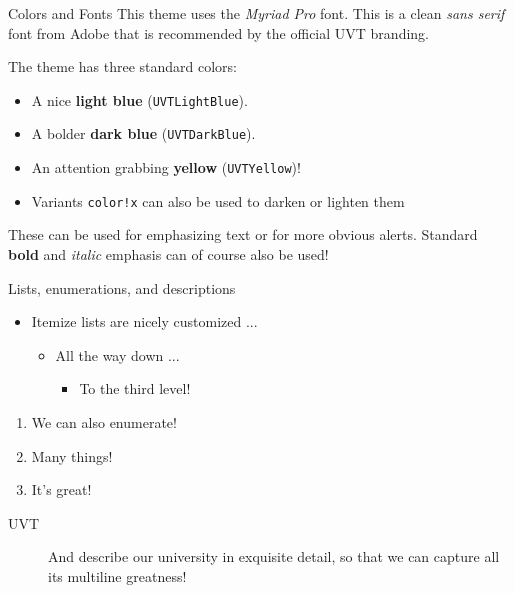 \documentclass[final]{beamer}
\begin{document}
\begin{frame}[fragile]
\begin{columns}[t]
\begin{column}{0.3\paperwidth}
\begin{block}{Colors and Fonts}
    This theme uses the \emph{Myriad Pro} font. This is a clean \emph{sans serif}
    font from Adobe that is recommended by the official UVT branding.

    \bigskip
    The theme has three standard colors:
    \begin{itemize}
        \item A nice \textcolor{UVTLightBlue}{\textbf{light blue}} (\texttt{UVTLightBlue}).
        \item A bolder \textcolor{UVTDarkBlue}{\textbf{dark blue}} (\texttt{UVTDarkBlue}).
        \item An attention grabbing \textcolor{UVTYellow}{\textbf{yellow}}
        (\texttt{UVTYellow})!
        \item Variants \texttt{color!x} can also be used to darken or lighten them
    \end{itemize}

    \bigskip
    These can be used for emphasizing \textcolor{UVTLightBlue}{text} or for
    more obvious \alert{alerts}. Standard \textbf{bold} and \textit{italic} emphasis
    can of course also be used!
\end{block}

\begin{alertblock}{Lists, enumerations, and descriptions}

\begin{itemize}
    \item Itemize lists are nicely customized ...
    \begin{itemize}
        \item All the way down ...
        \begin{itemize}
            \item To the third level!
        \end{itemize}
    \end{itemize}
\end{itemize}


\begin{enumerate}
    \item We can also enumerate!
    \item Many things!
    \item It's great!
\end{enumerate}


\begin{description}
    \item[UVT] And describe our university in exquisite detail, so that we
        can capture all its multiline greatness!
\end{description}
\end{alertblock}
\end{column}


\end{columns}
\end{frame}
\end{document}
